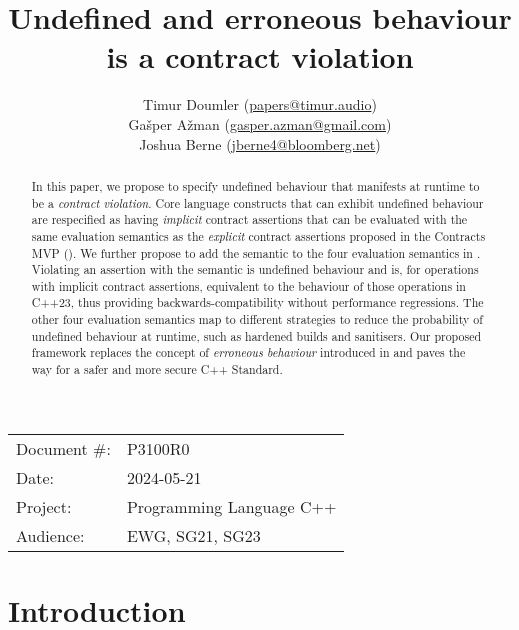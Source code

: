 

 \usepackage[bottom]{footmisc} 


\title{Undefined and erroneous behaviour is a contract violation}
\author{ Timur Doumler \small(\href{mailto:papers@timur.audio}{papers@timur.audio})  \\
Ga\v sper A\v zman \small(\href{mailto:gasper.azman@gmail.com}{gasper.azman@gmail.com})   \\
Joshua Berne \small(\href{mailto:jberne4@bloomberg.net}{jberne4@bloomberg.net})  
}
\date{}
\maketitle

\begin{tabular}{ll}
Document \#: & P3100R0 \\
Date: &2024-05-21 \\
Project: & Programming Language C++ \\
Audience: & EWG, SG21, SG23
\end{tabular}

\begin{abstract}
In this paper, we propose to specify undefined behaviour that manifests at runtime to be a \emph{contract violation}. Core language constructs that can exhibit undefined behaviour are respecified as having \emph{implicit} contract assertions that can be evaluated with the same evaluation semantics as the \emph{explicit} contract assertions proposed in the Contracts MVP (\cite{P2900R7}). We further propose to add the  semantic to the four evaluation semantics in \cite{P2900R7}. Violating an assertion with the  semantic is undefined behaviour and is, for operations with implicit contract assertions, equivalent to the behaviour of those operations in C++23, thus providing backwards-compatibility without performance regressions. The other four evaluation semantics map to different strategies to reduce the probability of undefined behaviour at runtime, such as hardened builds and sanitisers. Our proposed framework replaces the concept of \emph{erroneous behaviour} introduced in \cite{P2795R5} and paves the way for a safer and more secure C++ Standard.
\end{abstract}

\section{Introduction}
\label{sec:intro}

